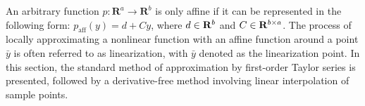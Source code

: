 An arbitrary function $p : \mathbf{R}^a \rightarrow \mathbf{R}^b$ is only affine if it can be represented in the following form: $p_\text{aff}(y) = d + Cy$, where $d \in \mathbf{R}^{b}$ and $C \in \mathbf{R}^{b \times a}$.
The process of locally approximating a nonlinear function with an affine function around a point $\bar{y}$ is often referred to as linearization, with $\bar{y}$ denoted as the linearization point. In this section, the standard method of approximation by first-order Taylor series is presented, followed by a derivative-free method involving linear interpolation of sample points.
